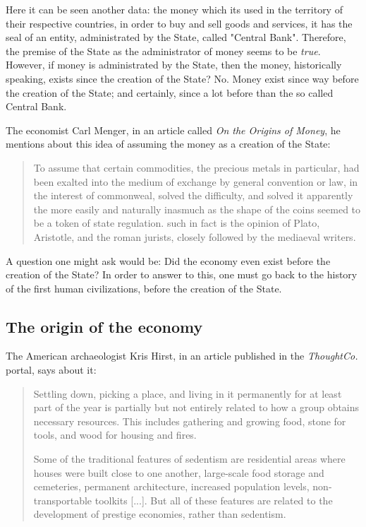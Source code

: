 \documentclass[12pt,a4paper,twoside]{book}
\begin{document}
Here it can be seen another data: the money which its used in the territory of their respective countries, in order to buy and sell goods and services, it has the seal of an entity, administrated by the State, called "Central Bank". Therefore, the premise of the State as the administrator of money seems to be \textit{true}. However, if money is administrated by the State, then the money, historically speaking, exists since the creation of the State? No. Money exist since way before the creation of the State; and certainly, since a lot before than the so called Central Bank.

The economist Carl Menger, in an article called \textit{On the Origins of Money}, he mentions about this idea of assuming the money as a creation of the State:

\begin{quotation}
To assume that certain commodities, the precious metals in particular, had been exalted into the medium of exchange by general convention or law, in the interest of commonweal, solved the difficulty, and solved it apparently the more easily and naturally inasmuch as the shape of the coins seemed to be a token of state regulation. such in fact is the opinion of Plato, Aristotle, and the roman jurists, closely followed by the mediaeval writers.  \cite[p. 16]{menger:origins}
\end{quotation}

A question one might ask would be: Did the economy even exist before the creation of the State? In order to answer to this, one must go back to the history of the first human civilizations, before the creation of the State.

\subsection{The origin of the economy}
The American archaeologist Kris Hirst, in an article published in the \textit{ThoughtCo.} portal, says about it:

\begin{quotation}
Settling down, picking a place, and living in it permanently for at least part of the year is partially but not entirely related to how a group obtains necessary resources. This includes gathering and growing food, stone for tools, and wood for housing and fires.

Some of the traditional features of sedentism are residential areas where houses were built close to one another, large-scale food storage and cemeteries, permanent architecture, increased population levels, non-transportable toolkits [...]. But all of these features are related to the development of prestige economies, rather than sedentism. \cite{krishirst}
\end{quotation}
\end{document}
